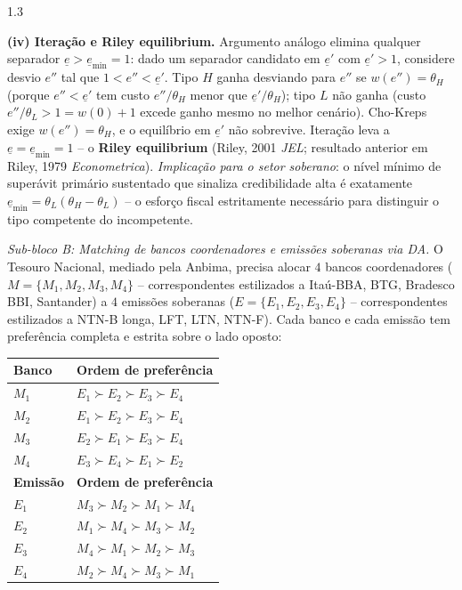 \documentclass[11pt,addpoints]{exam}
\begin{document}
\begin{spacing}{1.3}
\begin{questions}
\begin{parts}
\begin{solution}
\textbf{(iv) Iteração e Riley equilibrium.} Argumento análogo elimina qualquer separador $\underline{e} > \underline{e}_{\min} = 1$: dado um separador candidato em $\underline{e}'$ com $\underline{e}' > 1$, considere desvio $e''$ tal que $1 < e'' < \underline{e}'$. Tipo $H$ ganha desviando para $e''$ se $w(e'') = \theta_H$ (porque $e'' < \underline{e}'$ tem custo $e''/\theta_H$ menor que $\underline{e}'/\theta_H$); tipo $L$ não ganha (custo $e''/\theta_L > 1 = w(0) + 1$ excede ganho mesmo no melhor cenário). Cho-Kreps exige $w(e'') = \theta_H$, e o equilíbrio em $\underline{e}'$ não sobrevive. Iteração leva a $\underline{e} = \underline{e}_{\min} = 1$ -- o \textbf{Riley equilibrium} (Riley, 2001 \textit{JEL}; resultado anterior em Riley, 1979 \textit{Econometrica}). \emph{Implicação para o setor soberano}: o nível mínimo de superávit primário sustentado que sinaliza credibilidade alta é exatamente $\underline{e}_{\min} = \theta_L(\theta_H - \theta_L)$ -- o esforço fiscal estritamente necessário para distinguir o tipo competente do incompetente.
\end{solution}

\newpage
\noindent\emph{Sub-bloco B: Matching de bancos coordenadores e emissões soberanas via DA.} O Tesouro Nacional, mediado pela Anbima, precisa alocar $4$ bancos coordenadores ($M = \{M_1, M_2, M_3, M_4\}$ -- correspondentes estilizados a Itaú-BBA, BTG, Bradesco BBI, Santander) a $4$ emissões soberanas ($E = \{E_1, E_2, E_3, E_4\}$ -- correspondentes estilizados a NTN-B longa, LFT, LTN, NTN-F). Cada banco e cada emissão tem preferência completa e estrita sobre o lado oposto:

\begin{center}
\small
\begin{tabular}{@{}ll@{}}
\toprule
\textbf{Banco} & \textbf{Ordem de preferência} \\
\midrule
$M_1$ & $E_1 \succ E_2 \succ E_3 \succ E_4$ \\
$M_2$ & $E_1 \succ E_2 \succ E_3 \succ E_4$ \\
$M_3$ & $E_2 \succ E_1 \succ E_3 \succ E_4$ \\
$M_4$ & $E_3 \succ E_4 \succ E_1 \succ E_2$ \\
\midrule
\textbf{Emissão} & \textbf{Ordem de preferência} \\
\midrule
$E_1$ & $M_3 \succ M_2 \succ M_1 \succ M_4$ \\
$E_2$ & $M_1 \succ M_4 \succ M_3 \succ M_2$ \\
$E_3$ & $M_4 \succ M_1 \succ M_2 \succ M_3$ \\
$E_4$ & $M_2 \succ M_4 \succ M_3 \succ M_1$ \\
\bottomrule
\end{tabular}
\end{center}


\end{parts}
\end{questions}
\end{spacing}
\end{document}
